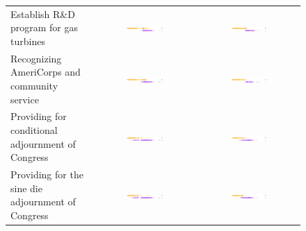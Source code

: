 \begin{figure}
\begin{tabular}{|p{4.3cm}|c|c|}
Establish R\&D program for gas turbines 
& \includegraphics[width=0.4\textwidth]{chapter_spatial_voting_with_text/figures/3397_ideal_point_8.pdf}
& \includegraphics[width=0.4\textwidth]{chapter_spatial_voting_with_text/figures/3397_adjusted_ideal_point_8.pdf} \\

Recognizing AmeriCorps and community service
& \includegraphics[width=0.4\textwidth]{chapter_spatial_voting_with_text/figures/3397_ideal_point_7.pdf}
& \includegraphics[width=0.4\textwidth]{chapter_spatial_voting_with_text/figures/3397_adjusted_ideal_point_7.pdf} \\

Providing for conditional adjournment of Congress
& \includegraphics[width=0.4\textwidth]{chapter_spatial_voting_with_text/figures/3397_ideal_point_6.pdf}
& \includegraphics[width=0.4\textwidth]{chapter_spatial_voting_with_text/figures/3397_adjusted_ideal_point_6.pdf} \\

Providing for the sine die adjournment of Congress
& \includegraphics[width=0.4\textwidth]{chapter_spatial_voting_with_text/figures/3397_ideal_point_5.pdf}
& \includegraphics[width=0.4\textwidth]{chapter_spatial_voting_with_text/figures/3397_adjusted_ideal_point_5.pdf} \\


\end{tabular}
\end{figure}
